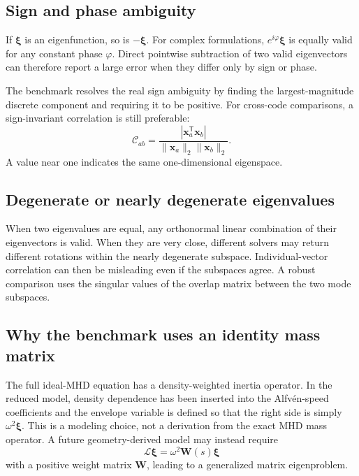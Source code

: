 \subsection{Sign and phase ambiguity}
If $\boldsymbol\xi$ is an eigenfunction, so is $-\boldsymbol\xi$. For complex formulations, $e^{i\varphi}\boldsymbol\xi$ is equally valid for any constant phase $\varphi$. Direct pointwise subtraction of two valid eigenvectors can therefore report a large error when they differ only by sign or phase.

The benchmark resolves the real sign ambiguity by finding the largest-magnitude discrete component and requiring it to be positive. For cross-code comparisons, a sign-invariant correlation is still preferable:
\begin{equation}
\mathcal C_{ab}=\frac{|\mathbf x_a^{\mathsf T}\mathbf x_b|}
{\|\mathbf x_a\|_2\|\mathbf x_b\|_2}.
\label{eq:mode_correlation}
\end{equation}
A value near one indicates the same one-dimensional eigenspace.

\subsection{Degenerate or nearly degenerate eigenvalues}
When two eigenvalues are equal, any orthonormal linear combination of their eigenvectors is valid. When they are very close, different solvers may return different rotations within the nearly degenerate subspace. Individual-vector correlation can then be misleading even if the subspaces agree. A robust comparison uses the singular values of the overlap matrix between the two mode subspaces.

\subsection{Why the benchmark uses an identity mass matrix}
The full ideal-MHD equation has a density-weighted inertia operator. In the reduced model, density dependence has been inserted into the Alfv\'en-speed coefficients and the envelope variable is defined so that the right side is simply $\omega^2\boldsymbol\xi$. This is a modeling choice, not a derivation from the exact MHD mass operator. A future geometry-derived model may instead require
\begin{equation}
\mathcal L\boldsymbol\xi=\omega^2\mathbf W(s)\boldsymbol\xi
\end{equation}
with a positive weight matrix $\mathbf W$, leading to a generalized matrix eigenproblem.
